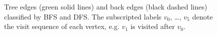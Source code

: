 \begin{figure}[t]
\begin{subfigure}{.3\columnwidth}
\label{subfig:edge_type_c}
\end{subfigure}
\caption{Tree edges (green solid lines) and back edges (black dashed lines) classified by BFS and DFS. The subscripted labels $v_0$, \dots, $v_5$ denote the visit sequence of each vertex, e.g. $v_1$ is visited after $v_0$.}
\label{fig:edge_type}
\end{figure}